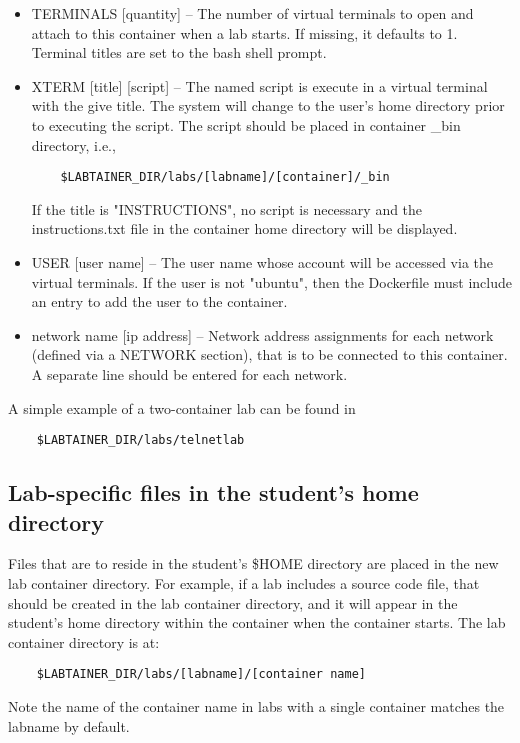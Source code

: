 \documentclass{article}
\begin{document}
\begin{itemize}
\begin{itemize}
\item TERMINALS [quantity] -- The number of virtual terminals to open and attach to this 
container when a lab starts.  If missing, it defaults to 1. Terminal titles are set to the 
bash shell prompt.
\item XTERM [title] [script] -- The named script is execute in a virtual terminal with the
give title.   The system will change to the user's home directory prior to executing the
script.  The script should be placed in container \_bin directory, i.e.,
\begin{verbatim}
    $LABTAINER_DIR/labs/[labname]/[container]/_bin
\end{verbatim}
\noindent If the title is "INSTRUCTIONS", no script is necessary and the instructions.txt file
in the container home directory will be displayed.
\item USER [user name] -- The user name whose account will be accessed via the virtual terminals. If
the user is not "ubuntu", then the Dockerfile must include an entry to add the user to the container.
\item network name [ip address] -- Network address assignments for each network (defined via a NETWORK section), 
that is to be connected to this container.  A separate line should be entered for each network.
\end{itemize}
\end{itemize}
  
A simple example of a two-container lab can be found in 
\begin{verbatim}
    $LABTAINER_DIR/labs/telnetlab
\end{verbatim}


\subsection {Lab-specific files in the student's home directory}
Files that are to reside in the student's \$HOME directory are placed in the 
new lab container directory.  For example, if a lab includes a source code file, that
should be created in the lab container directory, and it will appear in the student's
home directory within the container when the container starts.  The lab container
directory is at:  

\begin{verbatim}
    $LABTAINER_DIR/labs/[labname]/[container name]
\end{verbatim}
Note the name of the container name in labs with a single container matches the labname by default.
\end{document}

